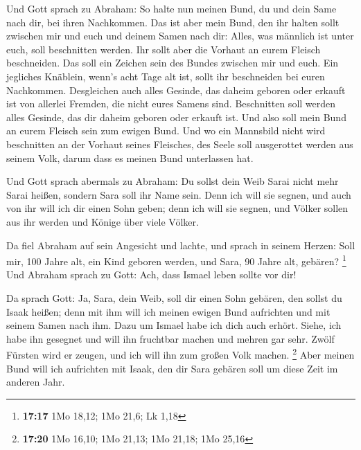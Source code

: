  Und Gott sprach zu Abraham: So halte nun meinen Bund, du
und dein Same nach dir, bei ihren Nachkommen.  Das ist
aber mein Bund, den ihr halten sollt zwischen mir und euch und deinem
Samen nach dir: Alles, was männlich ist unter euch, soll beschnitten
werden.  Ihr sollt aber die Vorhaut an eurem Fleisch
beschneiden. Das soll ein Zeichen sein des Bundes zwischen mir und euch.
 Ein jegliches Knäblein, wenn's acht Tage alt ist, sollt
ihr beschneiden bei euren Nachkommen. Desgleichen auch alles Gesinde,
das daheim geboren oder erkauft ist von allerlei Fremden, die nicht
eures Samens sind.  Beschnitten soll werden alles
Gesinde, das dir daheim geboren oder erkauft ist. Und also soll mein
Bund an eurem Fleisch sein zum ewigen Bund.  Und wo ein
Mannsbild nicht wird beschnitten an der Vorhaut seines Fleisches, des
Seele soll ausgerottet werden aus seinem Volk, darum dass es meinen Bund
unterlassen hat.

 Und Gott sprach abermals zu Abraham: Du sollst dein Weib
Sarai nicht mehr Sarai heißen, sondern Sara soll ihr Name sein.
 Denn ich will sie segnen, und auch von ihr will ich dir
einen Sohn geben; denn ich will sie segnen, und Völker sollen aus ihr
werden und Könige über viele Völker.

 Da fiel Abraham auf sein Angesicht und lachte, und
sprach in seinem Herzen: Soll mir, 100 Jahre alt, ein Kind geboren
werden, und Sara, 90 Jahre alt, gebären? \footnote{\textbf{17:17} 1Mo
  18,12; 1Mo 21,6; Lk 1,18}  Und Abraham sprach zu Gott:
Ach, dass Ismael leben sollte vor dir!

 Da sprach Gott: Ja, Sara, dein Weib, soll dir einen Sohn
gebären, den sollst du Isaak heißen; denn mit ihm will ich meinen ewigen
Bund aufrichten und mit seinem Samen nach ihm.  Dazu um
Ismael habe ich dich auch erhört. Siehe, ich habe ihn gesegnet und will
ihn fruchtbar machen und mehren gar sehr. Zwölf Fürsten wird er zeugen,
und ich will ihn zum großen Volk machen. \footnote{\textbf{17:20} 1Mo
  16,10; 1Mo 21,13; 1Mo 21,18; 1Mo 25,16}  Aber meinen
Bund will ich aufrichten mit Isaak, den dir Sara gebären soll um diese
Zeit im anderen Jahr.

